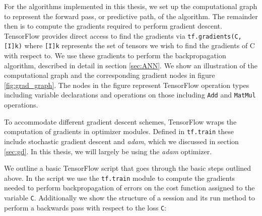For the algorithms implemented in this thesis, we set up the computational graph to represent the forward pass, or predictive path, of the algorithm. The remainder then is to compute the gradients required to perform gradient descent. TensorFlow provides direct access to find the gradients via \lstinline{tf.gradients(C, [I]k)} where \lstinline{[I]k} represents the set of tensors we wish to find the gradients of C with respect to. We use these gradients to perform the backpropagation algorithm, described in detail in section \ref{sec:ANN}. We show an illustration of the computational graph and the corresponding gradient nodes in figure \ref{fig:grad_graph}. The nodes in the figure represent TensorFlow operation types including variable declarations and operations on those including \lstinline{Add} and \lstinline{MatMul} operations.

To accommodate different gradient descent schemes, TensorFlow wraps the computation of gradients in optimizer modules. Defined in \lstinline{tf.train} these include stochastic gradient descent and \textit{adam}, which we discussed in section \ref{sec:gd}. In this thesis, we will largely be using the \textit{adam} optimizer.

We outline a basic TensorFlow script that goes through the basic steps outlined above. In the script we use the \lstinline{tf.train} module to compute the gradients needed to perform backpropagation of errors on the cost function assigned to the variable \lstinline{C}. Additionally we show the structure of a session and its run method to perform a backwards pass with respect to the loss \lstinline{C}:

\begin{minipage}{\linewidth}

\end{minipage}